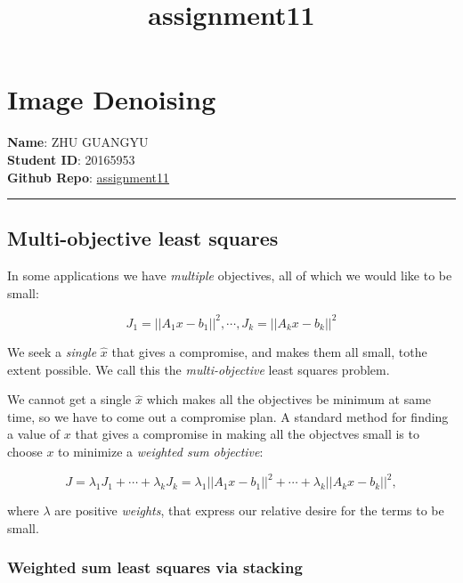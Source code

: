 \documentclass[11pt]{article}
\title{assignment11}
\begin{document}
    
    
    \maketitle
    
    

    
    \section{Image Denoising}\label{image-denoising}

\textbf{Name}: ZHU GUANGYU\\
\textbf{Student ID}: 20165953\\
\textbf{Github Repo}:
\href{https://github.com/z1ggy-o/cv_assignment/tree/master/assignment11}{assignment11}

\begin{center}\rule{0.5\linewidth}{\linethickness}\end{center}

\subsection{Multi-objective least
squares}\label{multi-objective-least-squares}

In some applications we have \emph{multiple} objectives, all of which we
would like to be small:

\[J_{1} = ||A_{1}x-b_{1}||^{2}, \cdots, J_{k} = ||A_{k}x-b_{k}||^{2} \]

We seek a \emph{single} \(\hat{x}\) that gives a compromise, and makes
them all small, tothe extent possible. We call this the
\emph{multi-objective} least squares problem.

We cannot get a single \(\hat{x}\) which makes all the objectives be
minimum at same time, so we have to come out a compromise plan. A
standard method for finding a value of \(x\) that gives a compromise in
making all the objectves small is to choose \(x\) to minimize a
\emph{weighted sum objective}:

\[ J = \lambda_{1}J_{1} + \cdots + \lambda_{k}J_{k} = \lambda_{1}||A_{1}x-b_{1}||^{2} + \cdots + \lambda_{k}||A_{k}x-b_{k}||^{2}, \]

where \(\lambda\) are positive \emph{weights}, that express our relative
desire for the terms to be small.

\subsubsection{Weighted sum least squares via
stacking}\label{weighted-sum-least-squares-via-stacking}
\end{document}
